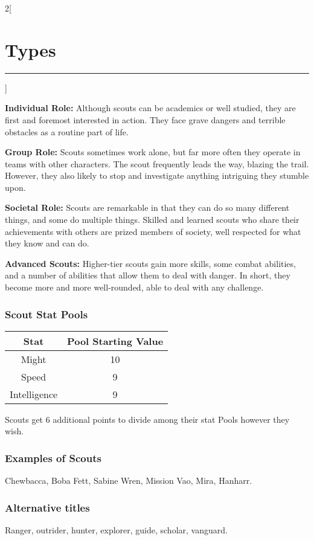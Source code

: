\documentclass[a4paper,10pt,final]{book}
\newcommand{\HRule}{\rule{\linewidth}{0.5mm}} %
\newcommand{\newSection}[1]{\section*{#1} \addcontentsline{toc}{section}{#1} \label{sec:#1} \HRule}
\newcommand{\statPool}[5]
{
	\subsubsection*{#1 Stat Pools}
	\label{subsub:#1StatPools} 	
	\begin{center}
	\begin{tabular}{ |c|c| } 
	\hline
	\textbf{Stat} & \textbf{Pool Starting Value} \\ 
	\hline \hline
	Might & #2 \\ 
	\hline
 	Speed & #3  \\
 	\hline 
 	Intelligence & #4  \\ 
 	\hline
	\end{tabular}
	\end{center}
	#1s get #5 additional points to divide among their stat Pools however they wish.
}
\newcommand{\itemLine}[2]{\textbf{#1:} {#2}\par}
\newenvironment{docsection}[1]
{
  \begin{multicols*}{2}[\newSection{#1}]
}
{
  \end{multicols*}
  \newpage
}
\begin{document}
\begin{docsection}{Types}
\itemLine{Individual Role} {Although scouts can be academics or well studied, they are first and foremost interested in action. They face grave dangers and terrible obstacles as a routine part of life.}
\itemLine{Group Role} {Scouts sometimes work
alone, but far more often they operate in teams
with other characters. The scout frequently
leads the way, blazing the trail. However, they
also likely to stop and investigate anything
intriguing they stumble upon.}
\itemLine{Societal Role} {Scouts are remarkable in
that they can do so many different
things, and some do multiple
things. Skilled and learned scouts
who share their achievements with
others are prized members
of society, well respected for
what they know and can do.}
\itemLine{Advanced Scouts} {Higher-tier scouts
gain more skills, some combat abilities, and
a number of abilities that allow them to deal
with danger. In short, they become more
and more well-rounded, able to deal with
any challenge.}

\statPool{Scout}{10}{9}{9}{6}

\subsubsection*{Examples of Scouts}
\label{subsub:scoutExamples}
Chewbacca, Boba Fett, Sabine Wren, Mission Vao, Mira, Hanharr.

\subsubsection*{Alternative titles}
\label{subsub:scoutAlternative}
Ranger, outrider, hunter, explorer, guide, scholar, vanguard.


\end{docsection}
\end{document}
